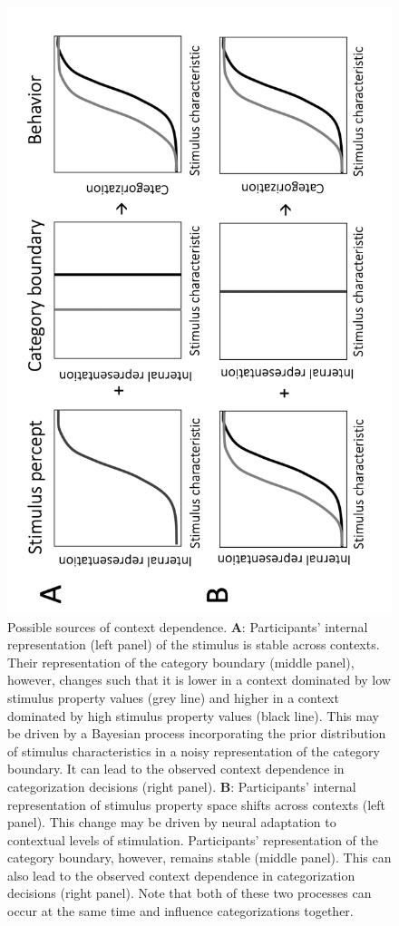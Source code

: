 \documentclass[a4paper, nobind]{templates/ociamthesis}
\begin{document}
\begin{figure}

{\centering \includegraphics[width=0.8\linewidth]{figures/cat-expl} 

}

\caption[Sources of context dependence]{Possible sources of context dependence. $\textbf{A:}$ Participants' internal representation (left panel) of the stimulus is stable across contexts. Their representation of the category boundary (middle panel), however, changes such that it is lower in a context dominated by low stimulus property values (grey line) and higher in a context dominated by high stimulus property values (black line). This may be driven by a Bayesian process incorporating the prior distribution of stimulus characteristics in a noisy representation of the category boundary. It can lead to the observed context dependence in categorization decisions (right panel). $\textbf{B:}$ Participants' internal representation of stimulus property space shifts across contexts (left panel). This change may be driven by neural adaptation to contextual levels of stimulation. Participants' representation of the category boundary, however, remains stable (middle panel). This can also lead to the observed context dependence in categorization decisions (right panel). Note that both of these two processes can occur at the same time and influence categorizations together.}\label{fig:cat-expl}
\end{figure}
\end{document}
